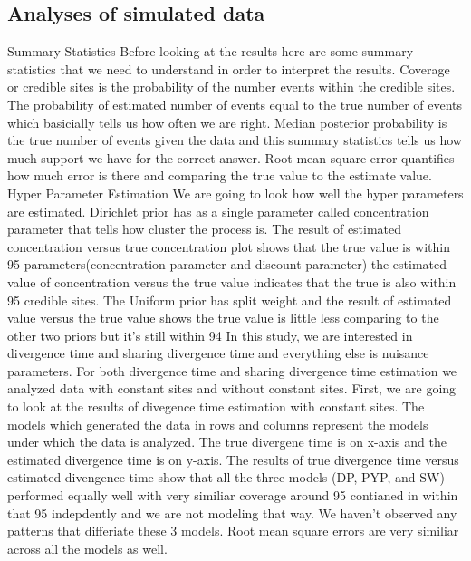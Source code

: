 \subsection{Analyses of simulated data}

Summary Statistics
Before looking at the results here are some summary statistics that we need to 
understand in order to interpret the results. Coverage or credible sites is the probability
of the number events within the credible sites. The probability of estimated number 
of events equal to the true number of events which basicially tells us how often we 
are right. Median posterior probability is the true number of events given the data 
and this summary statistics tells us how much support we have for the correct answer.
Root mean square error quantifies how much error is there and comparing the true 
value to the estimate value. 
Hyper Parameter Estimation 
We are going to look how well the hyper parameters are estimated. Dirichlet
prior has as a single parameter called concentration parameter that tells how cluster 
the process is. The result of estimated concentration versus true concentration plot
shows that the true value is within 95%
parameters(concentration parameter and discount parameter) the estimated value of 
concentration versus the true value indicates that the true is also within 95%
credible sites. The Uniform prior has split weight and the result of estimated value 
versus the true value shows the true value is little less comparing to the other two 
priors but it's still within 94%
In this study, we are interested in divergence time and sharing divergence time and 
everything else is nuisance parameters. For both divergence time and sharing divergence time 
estimation we analyzed data with constant sites and without constant sites. First, we are going 
to look at the results of divegence time estimation with constant sites. The models which generated 
the data in rows and columns represent the models under which the data is analyzed. The true divergene 
time is on x-axis and the estimated divergence time is on y-axis. The results of true divergence 
time versus estimated divengence time show that all the three models (DP, PYP, and SW) performed
equally well with very similiar coverage around 95%
contianed in within that 95%
indepdently and we are not modeling that way. We haven't observed any patterns that differiate
these 3 models. Root mean square errors are very similiar across all the models as well. 
